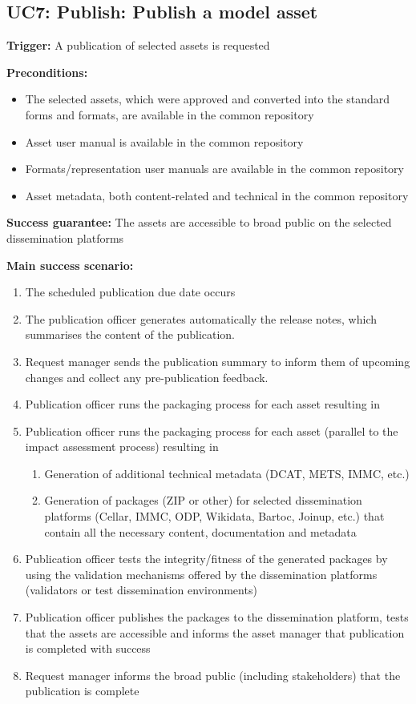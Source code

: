 	\subsection{UC7: Publish: Publish a model asset}
	\label{sec:uc7}
		
	\textbf{Trigger:} A publication of selected assets is requested
	
	\textbf{Preconditions:} 
	\begin{itemize}
		\item The selected assets, which were approved and converted into the standard forms and formats, are available in the common repository
		\item Asset user manual is available in the common repository
		\item Formats/representation user manuals are available in the common repository
		\item Asset metadata, both content-related and technical in the common repository
	\end{itemize}
	
	\textbf{Success guarantee:} The assets are accessible to broad public on the selected dissemination platforms
	
	\textbf{Main success scenario:} 
	\begin{enumerate}
		\item The scheduled publication due date occurs
		\item The publication officer generates automatically the release notes, which summarises the content of the publication.
		\item Request manager sends the publication summary to inform them of upcoming changes and collect any pre-publication feedback.
		\item Publication officer runs the packaging process for each asset resulting in
		\item Publication officer runs the packaging process for each asset (parallel to the impact assessment process) resulting in 
		\begin{enumerate}
			\item Generation of additional technical metadata (DCAT, METS, IMMC, etc.)
			\item Generation of packages (ZIP or other) for selected dissemination platforms (Cellar, IMMC, ODP, Wikidata, Bartoc, Joinup, etc.) that contain all the necessary content, documentation and metadata
		\end{enumerate}
		\item Publication officer tests the integrity/fitness of the generated packages by using the validation mechanisms offered by the dissemination platforms (validators or test dissemination environments)
		\item Publication officer publishes the packages to the dissemination platform, tests that the assets are accessible and informs the asset manager that publication is completed with success
		\item Request manager informs the broad public (including stakeholders) that the publication is complete
		
	\end{enumerate}
	
